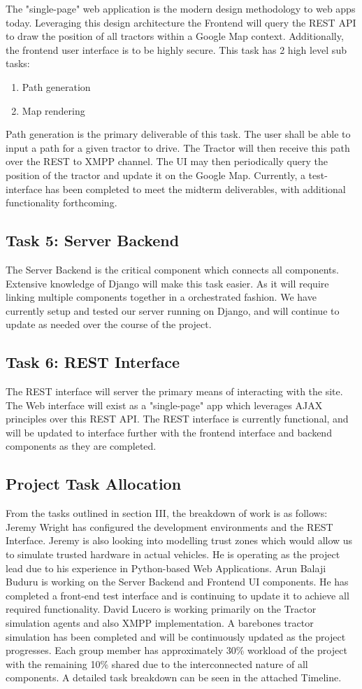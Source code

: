 \documentclass[conference,12pt]{IEEEtran}
\begin{document}
The "single-page" web application is the modern design methodology to web apps
today. Leveraging this design architecture the Frontend will query the REST API
to draw the position of all tractors within a Google Map context. Additionally, 
the frontend user interface is to be highly secure. This task has
2 high level sub tasks:
\begin{enumerate}
\item Path generation
\item Map rendering
\end{enumerate}
Path generation is the primary deliverable of this task. The user shall be able
to input a path for a given tractor to drive. The Tractor will then receive this
path over the REST to XMPP channel.  The UI may then periodically query the
position of the tractor and update it on the Google Map. Currently,
a test-interface has been completed to meet the midterm deliverables, with
additional functionality forthcoming.  \subsection{Task 5: Server Backend} The
Server Backend is the critical component which connects all components.
Extensive knowledge of Django will make this task easier. As it will require
linking multiple components together in a orchestrated fashion. We have
currently setup and tested our server running on Django, and will continue to
update as needed over the course of the project.  \subsection{Task 6: REST
Interface} The REST interface will server the primary means of interacting with
the site.  The Web interface will exist as a "single-page" app which leverages
AJAX principles over this REST API. The REST interface is currently functional,
and will be updated to interface further with the frontend interface and backend
components as they are completed.  \subsection{Project Task Allocation}

From the tasks outlined in section III, the breakdown of work is as follows:
Jeremy Wright has configured the development environments and the REST Interface. Jeremy is also looking into modelling trust zones which would allow us to simulate trusted hardware in actual vehicles.
He is operating as the project lead due to his experience in Python-based Web Applications.
Arun Balaji Buduru is working on the Server Backend and Frontend UI components. He has completed a front-end test interface and is continuing to update it to achieve all required functionality.
David Lucero is working primarily on the Tractor simulation agents and also XMPP implementation. A barebones tractor simulation has been completed and will be continuously updated as the project progresses.
Each group member has approximately 30\% workload of the project with the remaining
10\% shared due to the interconnected nature of all components. A detailed task breakdown
can be seen in the attached Timeline.
\end{document}
